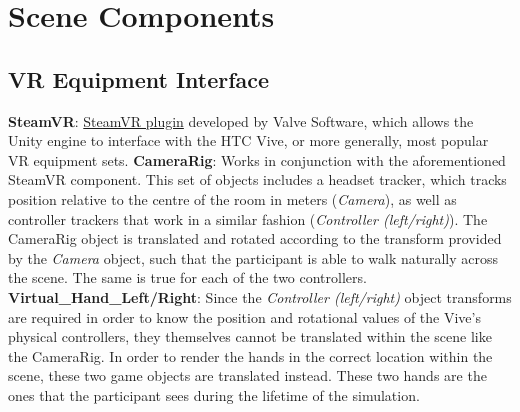 \documentclass{article}
\begin{document}
\section{Scene Components}
\subsection{VR Equipment Interface}
\textbf{SteamVR}: \href{https://bit.ly/2VnzLbI}{SteamVR plugin} developed by Valve Software, which allows the Unity engine to interface with the HTC Vive, or more generally, most popular VR equipment sets. \newline \newline
\textbf{CameraRig}: Works in conjunction with the aforementioned SteamVR component. This set of objects includes a headset tracker, which tracks position relative to the centre of the room in meters (\textit{Camera}), as well as controller trackers that work in a similar fashion (\textit{Controller (left\slash right)}). The CameraRig object is translated and rotated according to the transform provided by the \textit{Camera} object, such that the participant is able to walk naturally across the scene. The same is true for each of the two controllers. \newline \newline
\textbf{Virtual\_Hand\_Left\slash Right}: Since the \textit{Controller (left\slash right)} object transforms are required in order to know the position and rotational values of the Vive's physical controllers, they themselves cannot be translated within the scene like the CameraRig. In order to render the hands in the correct location within the scene, these two game objects are translated instead. These two hands are the ones that the participant sees during the lifetime of the simulation. 
\end{document}
